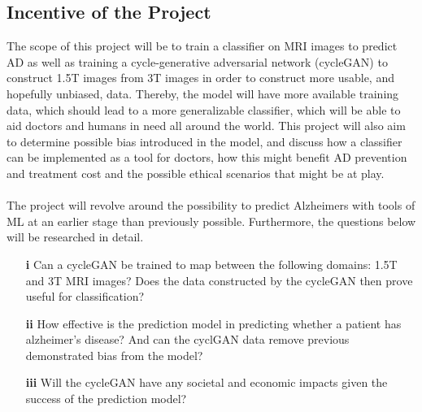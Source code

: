 \documentclass[12pt, fleqn, titlepage]{article}
\newcommand{\1}[1]{\mathds{1}\left[#1\right]}
\begin{document}
\subsection{Incentive of the Project}
The scope of this project will be to train a classifier on MRI images to predict AD as well as training a cycle-generative adversarial network (cycleGAN)
to construct 1.5T images from 3T images in order to construct more usable, and
hopefully unbiased, data. Thereby, the model will have more available training
data, which should lead to a more generalizable classifier, which will be able to aid doctors and humans in need all around the world. This project will also aim to determine possible bias introduced in the model, and discuss how a classifier can be implemented as a tool for doctors, how this might benefit AD prevention and
treatment cost and the possible ethical scenarios that might be at play.
\\\\
The project will revolve around the possibility to predict Alzheimers with tools of ML at an
earlier stage than previously possible. Furthermore, the questions below will be researched in detail.

\begin{itemize}
	\item[\textbf{i}] Can a cycleGAN be trained to map between the following domains: 1.5T and 3T MRI
	images? Does the data constructed by the cycleGAN then prove useful for classification?
	
	\item[\textbf{ii}] How effective is the prediction model in predicting whether a patient has
	alzheimer’s disease? And can the cyclGAN data remove previous demonstrated bias from the model?
	
	\item[\textbf{iii}] Will the cycleGAN have any societal and economic impacts
	given the success of the prediction model?
	
\end{itemize}
\end{document}
